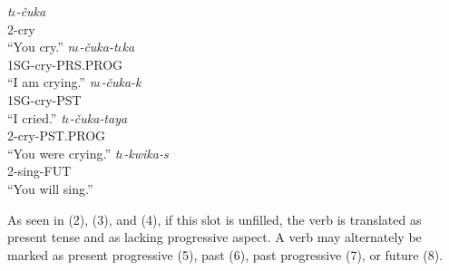 \documentclass[doc,12pt]{apa6}
\begin{document}
\begin{exe}
	\ex \textit{t$\iota$-\v{c}uka} \\
		2-cry \\
		``You cry.''
	\ex \textit{n$\iota$-\v{c}uka-t$\iota$ka} \\
		1SG-cry-PRS.PROG \\
		``I am crying.''
	\ex \textit{n$\iota$-\v{c}uka-k} \\
		1SG-cry-PST \\
		``I cried.''
	\ex \textit{t$\iota$-\v{c}uka-taya} \\
		2-cry-PST.PROG \\
		``You were crying.''
	\ex \textit{t$\iota$-kwika-s} \\
		2-sing-FUT \\
		``You will sing.''
\end{exe}

As seen in (2), (3), and (4), if this slot is unfilled, the verb is translated
as present tense and as lacking progressive aspect. A verb may alternately be
marked as present progressive (5), past (6), past progressive (7), or future
(8).
\end{document}
